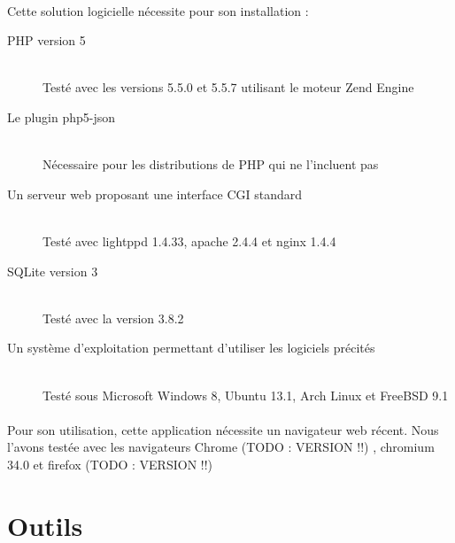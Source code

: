     \paragraph{}
        Cette solution logicielle nécessite pour son installation :
        \begin{description}
            \item[PHP version 5]\hfill \\
                Testé avec les versions 5.5.0 et 5.5.7 utilisant le moteur Zend Engine
            \item[Le plugin php5-json]\hfill \\
                Nécessaire pour les distributions de PHP qui ne l'incluent pas
            \item[Un serveur web proposant une interface CGI standard]\hfill \\
                Testé avec lightppd 1.4.33, apache 2.4.4 et nginx 1.4.4
            \item[SQLite version 3]\hfill \\
                Testé avec la version 3.8.2
            \item[Un système d'exploitation permettant d'utiliser les logiciels précités]\hfill \\
                Testé sous Microsoft Windows 8, Ubuntu 13.1, Arch Linux et FreeBSD 9.1
        \end{description}

    \paragraph{}
        Pour son utilisation, cette application nécessite un navigateur web
        récent. Nous l'avons testée avec les navigateurs Chrome
        (TODO : VERSION !!)
        , chromium 34.0 et firefox
        (TODO : VERSION !!)

\pagebreak
\section{Outils}
